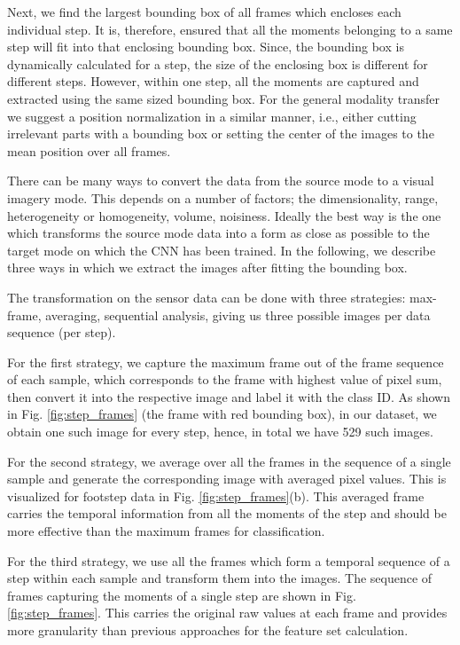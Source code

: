 Next, we find the largest bounding box of all frames which encloses each individual step. It is, therefore, ensured that all the moments belonging to a same step will fit into that enclosing bounding box. Since, the bounding box is dynamically calculated for a step, the size of the enclosing box is different for different steps. However, within one step, all the moments are captured and extracted using the same sized bounding box. For the general modality transfer we suggest a position normalization in a similar manner, i.e., either cutting irrelevant parts with a bounding box or setting the center of the images to the mean position over all frames.

There can be many ways to convert the data from the source mode to a visual imagery mode. This depends on a number of factors; the dimensionality, range, heterogeneity or homogeneity, volume, noisiness. Ideally the best way is the one which transforms the source mode data into a form as close as possible to the target mode on which the CNN has been trained. In the following, we describe three ways in which we extract the images after fitting the bounding box. 

The transformation on the sensor data can be done with three strategies: max-frame, averaging, sequential analysis, giving us three possible images per data sequence (per step). 

For the first strategy, we capture the maximum frame out of the frame sequence of each sample, which corresponds to the frame with highest value of pixel sum, then convert it into the respective image and label it with the class ID. As shown in Fig. \ref{fig:step_frames} (the frame with red bounding box), in our dataset, we obtain one such image for every step, hence, in total we have 529 such images. 

For the second strategy, we average over all the frames in the sequence of a single sample and generate the corresponding image with averaged pixel values. This is visualized for footstep data in Fig. \ref{fig:step_frames}(b). This averaged frame carries the temporal information from all the moments of the step and should be more effective than the maximum frames for classification. 

For the third strategy, we use all the frames which form a temporal sequence of a step within each sample and transform them into the images. The sequence of frames capturing the moments of a single step are shown in Fig. \ref{fig:step_frames}. This carries the original raw values at each frame and provides more granularity than previous approaches for the feature set calculation. 

	